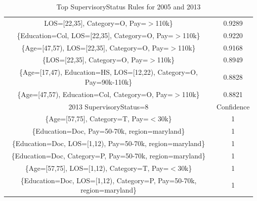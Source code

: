 \documentclass{article}
\begin{document}
\begin{center}
\begin{table}
\begin{tabular}{ |c|c| }
                LOS=[22,35],
                Category=O,
                Pay=$>$110k\} & 0.9289 \\
                \{Education=Col,
                LOS=[22,35],
                Category=O,
                Pay=$>$110k\} & 0.9220 \\
                \{Age=[47,57),
                LOS=[22,35],
                Category=O,
                Pay=$>$110k\} & 0.9168 \\
                \{LOS=[22,35],
                Category=O,
                Pay=$>$110k\} & 0.8949 \\
                \{Age=[17,47),
                Education=HS,
                LOS=[12,22),
                Category=O,
                Pay=90k-110k\} & 0.8828 \\
                \{Age=[47,57),
                Education=Col,
                Category=O,
                Pay=$>$110k\} & 0.8821 \\
                \hline
                2013 SupervisoryStatus=8 & Confidence \\
                \hline
                \{Age=[57,75],
                Category=T,
                Pay=$<$30k\} & 1 \\
                \{Education=Doc,
                Pay=50-70k,
                region=maryland\} & 1 \\
                \{Education=Doc,
                LOS=[1,12),
                Pay=50-70k,
                region=maryland\} & 1 \\
                \{Education=Doc,
                Category=P,
                Pay=50-70k,
                region=maryland\} & 1 \\
                \{Age=[57,75],
                LOS=[1,12),
                Category=T,
                Pay=$<$30k\} & 1 \\
                \{Education=Doc,
                LOS=[1,12),
                Category=P,
                Pay=50-70k,
                region=maryland\} & 1 \\
                \hline
            \end{tabular}
            \caption{Top SupervisoryStatus Rules for 2005 and 2013}
            \label{tab:8}
        \end{table}
    \end{center}
\end{document}
